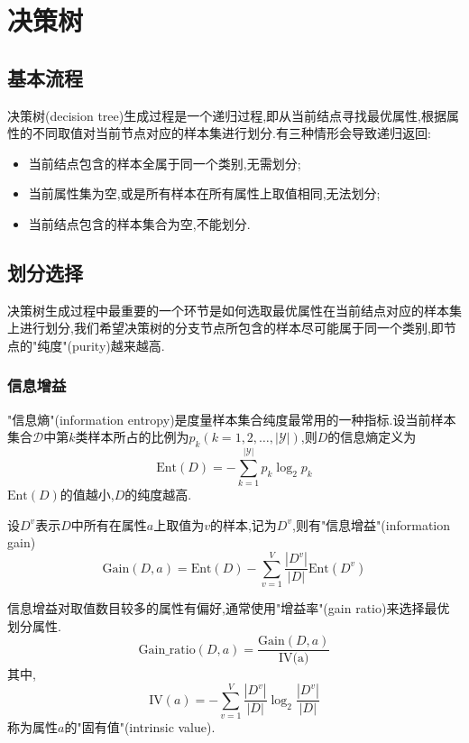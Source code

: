 \chapter{决策树}

\section{基本流程}

决策树(decision tree)生成过程是一个递归过程,即从当前结点寻找最优属性,根据属性的不同取值对当前节点对应的样本集进行划分.有三种情形会导致递归返回:

\begin{itemize}
\item 当前结点包含的样本全属于同一个类别,无需划分;
\item 当前属性集为空,或是所有样本在所有属性上取值相同,无法划分;
\item 当前结点包含的样本集合为空,不能划分.
\end{itemize}

\section{划分选择}

决策树生成过程中最重要的一个环节是如何选取最优属性在当前结点对应的样本集上进行划分,我们希望决策树的分支节点所包含的样本尽可能属于同一个类别,即节点的"纯度"(purity)越来越高.

\subsection{信息增益}

"信息熵"(information entropy)是度量样本集合纯度最常用的一种指标.设当前样本集合$\mathcal D$中第$k$类样本所占的比例为$p_k(k=1,2,\dots,|\mathcal Y|)$,则$D$的信息熵定义为
\begin{equation}
\text{Ent}(D)=-\sum_{k=1}^{|\mathcal Y|}p_k\log_2p_k
\end{equation}
$\text{Ent}(D)$的值越小,$D$的纯度越高.

设$D^v$表示$D$中所有在属性$a$上取值为$v$的样本,记为$D^v$,则有"信息增益"(information gain)
\begin{equation}
\text{Gain}(D,a)=\text{Ent}(D)-\sum_{v=1}^V\frac{|D^v|}{|D|}\text{Ent}(D^v)
\end{equation}

信息增益对取值数目较多的属性有偏好,通常使用"增益率"(gain ratio)来选择最优划分属性.
\begin{equation}
\text{Gain\_ratio}(D,a)=\frac{\text{Gain}(D,a)}{\text{IV(a)}}
\end{equation}
其中,
\begin{equation}
\text{IV}(a)=-\sum_{v=1}^V\frac{|D^v|}{|D|}\log_2\frac{|D^v|}{|D|}
\end{equation}
称为属性$a$的"固有值"(intrinsic value).

